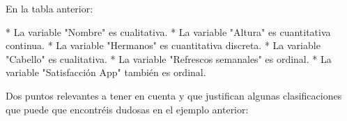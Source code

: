 \documentclass[
  letterpaper,
  DIV=11,
  numbers=noendperiod]{scrreprt}
\newenvironment{Shaded}{\begin{snugshade}}{\end{snugshade}}
\newcommand{\NormalTok}[1]{\textcolor[rgb]{0.00,0.23,0.31}{#1}}
\begin{document}
\begin{Shaded}
\begin{Highlighting}[]
\NormalTok{En la tabla anterior:}
  
\NormalTok{* La variable "Nombre" es cualitativa.}
\NormalTok{* La variable "Altura" es cuantitativa continua.}
\NormalTok{* La variable "Hermanos" es cuantitativa discreta.}
\NormalTok{* La variable "Cabello" es cualitativa.}
\NormalTok{* La variable "Refrescos semanales" es ordinal.}
\NormalTok{* La variable "Satisfacción App" también es ordinal.}
\end{Highlighting}
\end{Shaded}

Dos puntos relevantes a tener en cuenta y que justifican algunas
clasificaciones que puede que encontréis dudosas en el ejemplo anterior:
\end{document}
